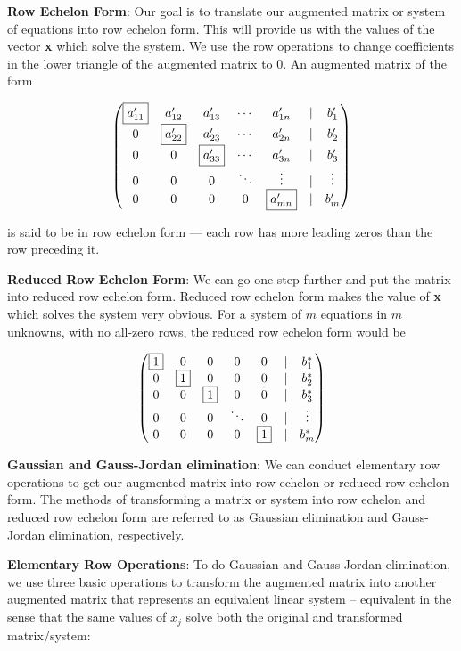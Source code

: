\documentclass[]{book}
\theoremstyle{definition}
\theoremstyle{definition}
\theoremstyle{definition}
\theoremstyle{remark}
\begin{document}
\textbf{Row Echelon Form}: Our goal is to translate our augmented matrix
or system of equations into row echelon form. This will provide us with
the values of the vector \textbf{x} which solve the system. We use the
row operations to change coefficients in the lower triangle of the
augmented matrix to 0. An augmented matrix of the form

\[\begin{pmatrix}
            \fbox{$a'_{11}$}& a'_{12} & a'_{13}& \cdots & a'_{1n} & | & b'_1\\
            0 & \fbox{$a'_{22}$} & a'_{23}& \cdots & a'_{2n} & | & b'_2\\
            0 & 0 & \fbox{$a'_{33}$}& \cdots & a'_{3n} & | & b'_3\\
            0 & 0 &0 & \ddots & \vdots  & | & \vdots \\
            0 & 0 &0 &0 & \fbox{$a'_{mn}$} & | & b'_m
            \end{pmatrix}\]

is said to be in row echelon form --- each row has more leading zeros
than the row preceding it.

\textbf{Reduced Row Echelon Form}: We can go one step further and put
the matrix into reduced row echelon form. Reduced row echelon form makes
the value of \textbf{x} which solves the system very obvious. For a
system of \(m\) equations in \(m\) unknowns, with no all-zero rows, the
reduced row echelon form would be

\[\begin{pmatrix}
            \fbox{$1$}  &  0 &   0 &    0  &   0 & | & b^*_1\\
            0  &  \fbox{$1$} &   0 &    0  &   0 & | & b^*_2\\
            0  &  0 &   \fbox{$1$} &    0  &   0 & | & b^*_3\\
            0  &  0 &   0 &\ddots &   0 & | &\vdots\\
            0  &  0 &   0 &    0  &   \fbox{$1$} & | & b^*_m
            \end{pmatrix}\]

\textbf{Gaussian and Gauss-Jordan elimination}: We can conduct
elementary row operations to get our augmented matrix into row echelon
or reduced row echelon form. The methods of transforming a matrix or
system into row echelon and reduced row echelon form are referred to as
Gaussian elimination and Gauss-Jordan elimination, respectively.

\textbf{Elementary Row Operations}: To do Gaussian and Gauss-Jordan
elimination, we use three basic operations to transform the augmented
matrix into another augmented matrix that represents an equivalent
linear system -- equivalent in the sense that the same values of \(x_j\)
solve both the original and transformed matrix/system:
\end{document}
